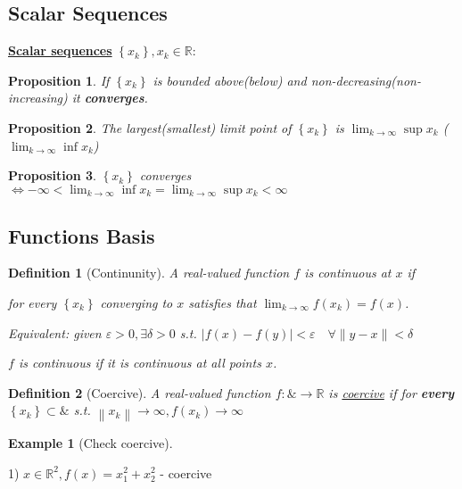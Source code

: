 \documentclass[11pt,a4paper]{article}
\newtheorem{definition}{Definition}
\newtheorem{proposition}{Proposition}
\newtheorem{example}{Example}
\begin{document}
\subsection{Scalar Sequences}
\textbf{\underline{Scalar sequences}} $\left\{x_{k}\right\}, x_{k} \in \mathbb{R}$:
\begin{proposition}
    If $\left\{x_{k}\right\}$ is bounded above(below) and non-decreasing(non-increasing) it \textbf{converges}.
\end{proposition}

\begin{proposition}
    The largest(smallest) limit point of $\left\{x_{k}\right\}$ is $\lim _{k \rightarrow \infty}\sup x_{k}$ ($\lim _{k \rightarrow \infty}\inf x_{k}$)
\end{proposition}

\begin{proposition}
    $\left\{x_{k}\right\}$ converges $\Longleftrightarrow-\infty<\lim _{k \rightarrow \infty} \inf x_{k}=\lim _{k \rightarrow \infty}\sup x_{k}<\infty$
\end{proposition}

\subsection{Functions Basis}
\begin{definition}[Continunity]
    A real-valued function $f$ is continuous at $x$ if
    
    for every $\left\{x_{k}\right\}$ converging to $x$ satisfies that $\lim _{k \rightarrow \infty} f\left(x_{k}\right)=f(x)$.

    Equivalent: given $\varepsilon>0, \exists \delta>0$ s.t.
    $|f(x)-f(y)|<\varepsilon \quad \forall\|y-x\|<\delta$

    $f$ is continuous if it is continuous at all points $x$.
\end{definition}

\begin{definition}[Coercive]
    A real-valued function $f:\& \rightarrow \mathbb{R}$ is \underline{coercive} if for \textbf{every} $\left\{x_{k}\right\} \subset \&$ s.t. $\left\|x_{k}\right\| \rightarrow \infty, f\left(x_{k}\right) \rightarrow \infty$
\end{definition}

\begin{example}[Check coercive]
\end{example}
1) $x \in \mathbb{R}^{2}, f(x)=x_{1}^{2}+x_{2}^{2}$ - coercive
\end{document}
